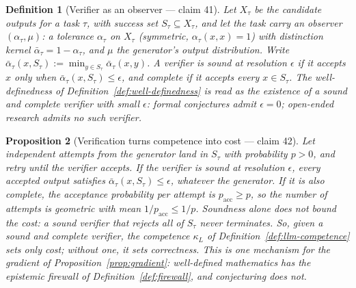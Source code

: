\documentclass[11pt,a4paper]{article}
\newtheorem{definition}{Definition}[section]
\newtheorem{proposition}[definition]{Proposition}
\begin{document}
\begin{definition}[Verifier as an observer --- claim 41]
\label{def:v2-resolution}
Let $X_\tau$ be the candidate outputs for a task $\tau$, with success set
$S_\tau\subseteq X_\tau$, and let the task carry an observer
$(\alpha_\tau,\mu)$: a tolerance $\alpha_\tau$ on $X_\tau$ (symmetric,
$\alpha_\tau(x,x)=1$) with distinction kernel $\bar\alpha_\tau=1-\alpha_\tau$,
and $\mu$ the generator's output distribution. Write
$\bar\alpha_\tau(x,S_\tau):=\min_{y\in S_\tau}\bar\alpha_\tau(x,y)$. A verifier
is \emph{sound at resolution} $\epsilon$ if it accepts $x$ only when
$\bar\alpha_\tau(x,S_\tau)\le\epsilon$, and \emph{complete} if it accepts
every $x\in S_\tau$. The well-definedness of
Definition~\ref{def:well-definedness} is read as the existence of a sound and
complete verifier with small $\epsilon$: formal conjectures admit $\epsilon=0$;
open-ended research admits no such verifier.
\end{definition}

\begin{proposition}[Verification turns competence into cost --- claim 42]
\label{prop:v2-verify}
Let independent attempts from the generator land in $S_\tau$ with probability
$p>0$, and retry until the verifier accepts. If the verifier is sound at
resolution $\epsilon$, every accepted output satisfies
$\bar\alpha_\tau(x,S_\tau)\le\epsilon$, whatever the generator. If it is also
complete, the acceptance probability per attempt is $p_{\mathrm{acc}}\ge p$,
so the number of attempts is geometric with mean $1/p_{\mathrm{acc}}\le1/p$.
Soundness alone does \emph{not} bound the cost: a sound verifier that rejects
all of $S_\tau$ never terminates. So, given a sound and complete verifier, the
competence $\kappa_L$ of Definition~\ref{def:llm-competence} sets only cost;
without one, it sets correctness. This is one mechanism for the gradient of
Proposition~\ref{prop:gradient}: well-defined mathematics has the epistemic
firewall of Definition~\ref{def:firewall}, and conjecturing does not.
\end{proposition}
\end{document}
